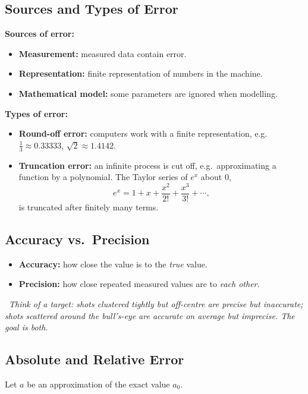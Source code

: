 \documentclass[hidelinks]{article}
\newcommand{\callout}[1]{\par\smallskip\noindent{\color{capri}$\blacktriangleright$}\ \textit{#1}\par\smallskip}
\begin{document}
\subsection{Sources and Types of Error}

\textbf{Sources of error:}
\begin{itemize}
    \item \textbf{Measurement:} measured data contain error.
    \item \textbf{Representation:} finite representation of numbers in the machine.
    \item \textbf{Mathematical model:} some parameters are ignored when modelling.
\end{itemize}

\textbf{Types of error:}
\begin{itemize}
    \item \textbf{Round-off error:} computers work with a finite representation, e.g.\ $\tfrac13\approx0.33333$, $\sqrt2\approx1.4142$.
    \item \textbf{Truncation error:} an infinite process is cut off, e.g.\ approximating a function by a polynomial. The Taylor series of $e^x$ about $0$,
    \[
    e^x=1+x+\frac{x^2}{2!}+\frac{x^3}{3!}+\cdots,
    \]
    is truncated after finitely many terms.
\end{itemize}

\subsection{Accuracy vs.\ Precision}

\begin{itemize}
    \item \textbf{Accuracy:} how close the value is to the \emph{true} value.
    \item \textbf{Precision:} how close repeated measured values are to \emph{each other}.
\end{itemize}

\callout{Think of a target: shots clustered tightly but off-centre are precise but inaccurate; shots scattered around the bull's-eye are accurate on average but imprecise. The goal is both.}

\subsection{Absolute and Relative Error}

Let $a$ be an approximation of the exact value $a_0$.
\end{document}
